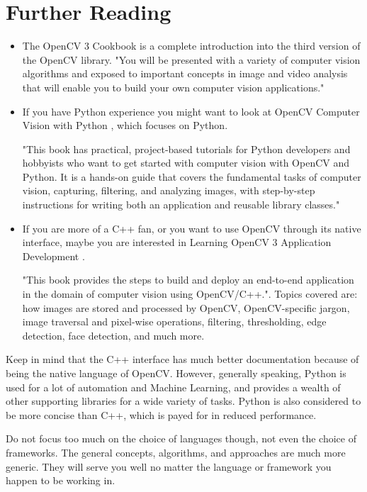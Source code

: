 \documentclass[12pt, a4paper]{article}
\begin{document}
\section{Further Reading}
\begin{itemize}
	\item The OpenCV 3 Cookbook \cite{openCVCookbook} is a complete introduction into the third version of the OpenCV library. "You will be presented with a variety of computer vision algorithms and exposed to important concepts in image and video analysis that will enable you to build your own computer vision applications." \cite{openCVCookbookWebsite}

	\item If you have Python experience you might want to look at OpenCV Computer Vision with Python \cite{openCVPython}, which focuses on Python.

	"This book has practical, project-based tutorials for Python developers and hobbyists who want to get started with computer vision with OpenCV and Python. It is a hands-on guide that covers the fundamental tasks of computer vision, capturing, filtering, and analyzing images, with step-by-step instructions for writing both an application and reusable library classes." \cite{openCVPythonWebsite}

	\item If you are more of a C++ fan, or you want to use OpenCV through its native interface, maybe you are interested in Learning OpenCV 3 Application Development \cite{openCVApplicationDevelopment}.

	"This book provides the steps to build and deploy an end-to-end application in the domain of computer vision using OpenCV/C++.". Topics covered are: how images are stored and processed by OpenCV, OpenCV-specific jargon, image traversal and pixel-wise operations, filtering, thresholding, edge detection, face detection, and much more. \cite{openCVApplicationDevelopmentWebsite}
\end{itemize}

Keep in mind that the C++ interface has much better documentation because of being the native language of OpenCV. However, generally speaking, Python is used for a lot of automation and Machine Learning, and provides a wealth of other supporting libraries for a wide variety of tasks. Python is also considered to be more concise than C++, which is payed for in reduced performance.

Do not focus too much on the choice of languages though, not even the choice of frameworks. The general concepts, algorithms, and approaches are much more generic. They will serve you well no matter the language or framework you happen to be working in.

\printbibliography
\end{document}
